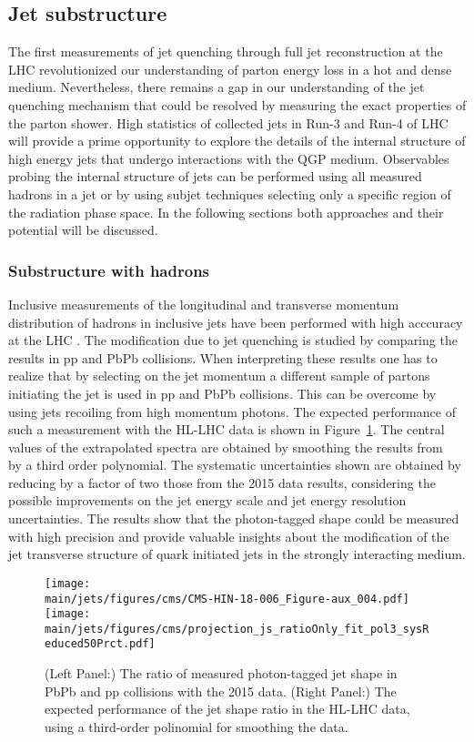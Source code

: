 \subsection{Jet substructure}
The first measurements of jet quenching through full jet reconstruction at the LHC revolutionized our understanding of parton energy loss in a hot and dense medium. Nevertheless, there remains a gap in our understanding of the jet quenching mechanism that could be resolved by measuring the exact properties of the parton shower. High statistics of collected jets in Run-3 and Run-4 of LHC will provide a prime opportunity to explore the details of the internal structure of high energy jets that undergo interactions with the QGP medium. Observables probing the internal structure of jets can be performed using all measured hadrons in a jet or by using subjet techniques selecting only a specific region of the radiation phase space. In the following sections both approaches and their potential will be discussed.

\subsubsection{Substructure with hadrons}
Inclusive measurements of the longitudinal and transverse momentum distribution of hadrons in inclusive jets have been performed with high acccuracy at the LHC \cite{Aaboud:2018hpb,Sirunyan:2018jqr}. The modification due to jet quenching is studied by comparing the results in pp and PbPb collisions. When interpreting these results one has to realize that by selecting on the jet momentum a different sample of partons initiating the jet is used in pp and PbPb collisions. This can be overcome by using jets recoiling from high momentum photons. The expected performance of such a measurement with the HL-LHC data is shown in Figure~\ref{fig:jetshape}. The central values of the extrapolated spectra are obtained by smoothing the results from~\cite{Sirunyan:2018ncy} by a third order polynomial. The systematic uncertainties shown are obtained by reducing by a factor of two those from the 2015 data results, considering the possible improvements on the jet energy scale and jet energy resolution uncertainties. The results show that the photon-tagged shape could be measured with high precision and provide valuable insights about the modification of the jet transverse structure of quark initiated jets in the strongly interacting medium.
%
\begin{figure}[!ht]
\begin{center}
\texttt{[image: \\main/jets/figures/cms/CMS-HIN-18-006\_Figure-aux\_004.pdf]}
\texttt{[image: \\main/jets/figures/cms/projection\_js\_ratioOnly\_fit\_pol3\_sysReduced50Prct.pdf]}
\caption{(Left Panel:) The ratio of measured photon-tagged jet shape in PbPb and pp collisions with the 2015 data. (Right Panel:) The expected performance of the jet shape ratio in the HL-LHC data, using a third-order polinomial for smoothing the data.}
\label{fig:jetshape}
\end{center}
\end{figure}


